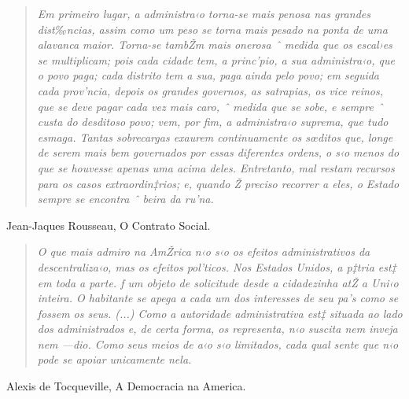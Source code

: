 \documentclass[a4paper, 12pt]{article}
\begin{document}

\thispagestyle{empty}
\noindent     
\setlength{\parindent}{0cm} \thispagestyle{empty}

\begin{quote}
\begin{footnotesize}
\emph{Em primeiro lugar, a administra‹o torna-se mais penosa nas grandes dist‰ncias, assim como um peso se torna mais pesado na ponta de uma alavanca maior. Torna-se tambŽm mais onerosa  ˆ medida que os escal›es se multiplicam; pois cada cidade tem, a princ’pio, a sua administra‹o, que o povo paga; cada distrito tem a sua, paga ainda pelo povo; em seguida cada prov’ncia, depois os grandes governos, as satrapias, os vice reinos, que se deve pagar cada vez mais caro, ˆ medida que se sobe, e sempre ˆ custa do desditoso povo; vem, por fim, a administra‹o suprema, que tudo esmaga. Tantas sobrecargas exaurem continuamente os sœditos que, longe de serem mais bem governados por essas diferentes ordens, o s‹o menos do que se houvesse apenas uma acima deles. Entretanto, mal restam recursos para os casos extraordin‡rios; e, quando Ž preciso recorrer a eles, o Estado sempre se encontra ˆ beira da ru’na.}
\end{footnotesize}
\end{quote}

\begin{flushright}
Jean-Jaques Rousseau, O Contrato Social.
\end{flushright}

\vspace*{1cm} 

\begin{quote}
\begin{footnotesize}
\emph{O que mais admiro na AmŽrica n‹o s‹o os efeitos administrativos da descentraliza‹o, mas os efeitos pol’ticos. Nos Estados Unidos, a p‡tria est‡ em toda a parte. ƒ um objeto de solicitude desde a cidadezinha atŽ a Uni‹o inteira. O habitante se apega a cada um dos interesses de seu pa’s como se fossem os seus. (...) Como a autoridade administrativa est‡ situada ao lado dos administrados e, de certa forma, os representa, n‹o suscita nem inveja nem —dio. Como seus meios de a‹o s‹o limitados, cada qual sente que n‹o pode se apoiar unicamente nela.}
\end{footnotesize}
\end{quote}
\begin{flushright}
Alexis de Tocqueville, A Democracia na America.
\end{flushright}
\end{document}
